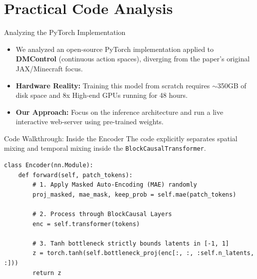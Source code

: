 \documentclass[aspectratio=169]{beamer}
\begin{document}
\section{Practical Code Analysis}

\begin{frame}{Analyzing the PyTorch Implementation}
    \begin{itemize}
        \item We analyzed an open-source PyTorch implementation applied to \textbf{DMControl} (continuous action spaces), diverging from the paper's original JAX/Minecraft focus.
        \item \textbf{Hardware Reality:} Training this model from scratch requires $\sim$350GB of disk space and 8x High-end GPUs running for 48 hours. 
        \item \textbf{Our Approach:} Focus on the inference architecture and run a live interactive web-server using pre-trained weights.
    \end{itemize}
\end{frame}

\begin{frame}[fragile]{Code Walkthrough: Inside the Encoder}
    The code explicitly separates spatial mixing and temporal mixing inside the \texttt{BlockCausalTransformer}.
    \begin{verbatim}
class Encoder(nn.Module):
    def forward(self, patch_tokens):
        # 1. Apply Masked Auto-Encoding (MAE) randomly
        proj_masked, mae_mask, keep_prob = self.mae(patch_tokens)
        
        # 2. Process through BlockCausal Layers
        enc = self.transformer(tokens)
        
        # 3. Tanh bottleneck strictly bounds latents in [-1, 1]
        z = torch.tanh(self.bottleneck_proj(enc[:, :, :self.n_latents, :]))
        return z
    \end{verbatim}
\end{frame}
\end{document}
